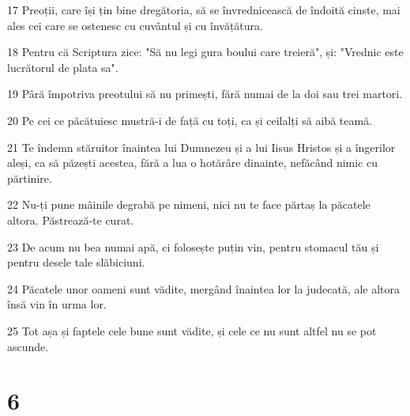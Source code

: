 \par 17 Preoții, care își țin bine dregătoria, să se învrednicească de îndoită cinste, mai ales cei care se ostenesc cu cuvântul și cu învățătura.
\par 18 Pentru că Scriptura zice: "Să nu legi gura boului care treieră", și: "Vrednic este lucrătorul de plata sa".
\par 19 Pâră împotriva preotului să nu primești, fără numai de la doi sau trei martori.
\par 20 Pe cei ce păcătuiesc mustră-i de față cu toți, ca și ceilalți să aibă teamă.
\par 21 Te îndemn stăruitor înaintea lui Dumnezeu și a lui Iisus Hristos și a îngerilor aleși, ca să păzești acestea, fără a lua o hotărâre dinainte, nefăcând nimic cu părtinire.
\par 22 Nu-ți pune mâinile degrabă pe nimeni, nici nu te face părtaș la păcatele altora. Păstrează-te curat.
\par 23 De acum nu bea numai apă, ci folosește puțin vin, pentru stomacul tău și pentru desele tale slăbiciuni.
\par 24 Păcatele unor oameni sunt vădite, mergând înaintea lor la judecată, ale altora însă vin în urma lor.
\par 25 Tot așa și faptele cele bune sunt vădite, și cele ce nu sunt altfel nu se pot ascunde.

\chapter{6}

